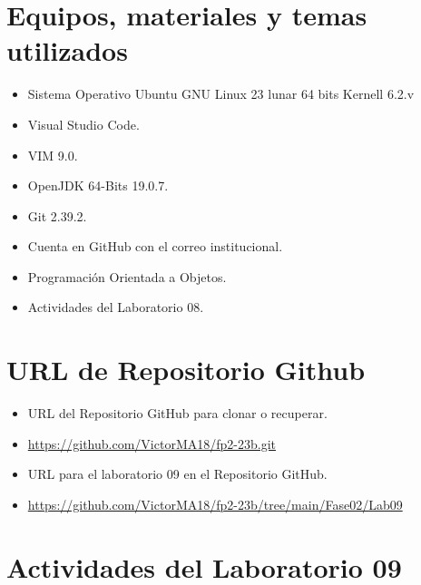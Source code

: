 \documentclass{article}
\begin{document}
	\section{Equipos, materiales y temas utilizados}
	\begin{itemize}
		\item Sistema Operativo Ubuntu GNU Linux 23 lunar 64 bits Kernell 6.2.v
		\item Visual Studio Code.
		\item VIM 9.0.
		\item OpenJDK 64-Bits 19.0.7.
		\item Git 2.39.2.
		\item Cuenta en GitHub con el correo institucional.
		\item Programación Orientada a Objetos.
		\item Actividades del Laboratorio 08.	
	\end{itemize}
	
	\section{URL de Repositorio Github}
	\begin{itemize}
		\item URL del Repositorio GitHub para clonar o recuperar.
		\item \url{https://github.com/VictorMA18/fp2-23b.git}
		\item URL para el laboratorio 09 en el Repositorio GitHub.
		\item \url{https://github.com/VictorMA18/fp2-23b/tree/main/Fase02/Lab09}
	\end{itemize}
	
	\section{Actividades del Laboratorio 09}
	
\end{document}
